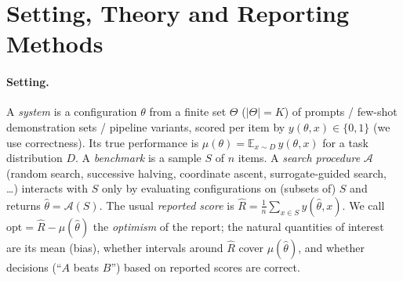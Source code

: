 \section{Setting, Theory and Reporting Methods}
\label{sec:method}
\paragraph{Setting.}
A \emph{system} is a configuration $\theta$ from a finite set $\Theta$ ($|\Theta|=K$) of prompts / few-shot demonstration sets / pipeline variants, scored per item by $y(\theta,x)\in\{0,1\}$ (we use correctness). Its true performance is $\mu(\theta)=\mathbb{E}_{x\sim D}\,y(\theta,x)$ for a task distribution $D$.
A \emph{benchmark} is a sample $S$ of $n$ items. A \emph{search procedure} $\mathcal{A}$ (random search, successive halving, coordinate ascent, surrogate-guided search, \dots) interacts with $S$ only by evaluating configurations on (subsets of) $S$ and returns $\hat\theta=\mathcal{A}(S)$. The usual \emph{reported score} is $\hat R=\frac1n\sum_{x\in S}y(\hat\theta,x)$.
We call $\mathrm{opt}=\hat R-\mu(\hat\theta)$ the \emph{optimism} of the report; the natural quantities of interest are its mean (bias), whether intervals around $\hat R$ cover $\mu(\hat\theta)$, and whether decisions (``$A$ beats $B$'') based on reported scores are correct.

